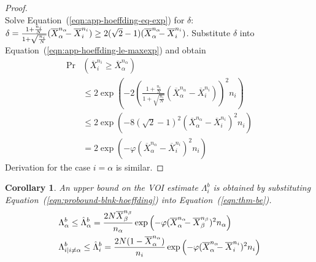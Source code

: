\documentclass[]{article}
\newtheorem{crl}[thm]{Corollary}
\renewcommand{\eqref}[1]{Equation~(\ref{#1})}
\begin{document}
\begin{hiddenproof}
\begin{proof}
\begin{equation}
	\end{equation}
	Solve \eqref{eqn:app-hoeffding-eq-exp} for $\delta$: $\delta=\frac {1+\frac {n_i} N} {1+\sqrt {\frac {n_i} N}} (\overline X_\alpha^{n_\alpha}\hspace{-0.5em}
	- \overline X_i^{n_i}) \ge 2(\sqrt 2 - 1)(\overline X_\alpha^{n_\alpha}\hspace{-0.5em}-\overline X_i^{n_i})$. Substitute $\delta$ into 
	\eqref{eqn:app-hoeffding-le-maxexp} and obtain
	\begin{align}
	\Pr&(\overline X_i^{n_i}\ge \overline X_\alpha^{n_\alpha}) \nonumber\\
	& \le 2\exp\left(-2\left( \frac {1+\frac {n_i} N} {1+\sqrt {\frac {n_i} N}}
	                          (\overline X_\alpha^{n_\alpha} - \overline X_i^{n_i})\right)^2 n_i\right)\nonumber \\
	& \le 2\exp(-8(\sqrt 2 - 1)^2(\overline X_\alpha^{n_\alpha} - \overline X_i^{n_i})^2n_i)\nonumber\\
	& = 2\exp(-\varphi(\overline X_\alpha^{n_\alpha} - \overline X_i^{n_i})^2n_i)
	\end{align}
	Derivation for the case $i=\alpha$ is similar.
	\end{proof}	
\end{hiddenproof}

\begin{crl}
An upper bound on the VOI estimate $\Lambda_i^b$ is obtained
by substituting \eqref{eqn:probound-blnk-hoeffding} into \eqref{eqn:thm-be}.
\begin{align}
  \label{eqn:bound-blnk-hoeffding}
  \Lambda&_\alpha^b \le \hat\Lambda_\alpha^b=\frac {2N\overline X_\beta^{n_\beta}} {n_\alpha}\exp\left(- \varphi(\overline X_\alpha^{n_\alpha}\hspace{-0.5em} - \overline X_\beta^{n_\beta})^2 n_\alpha\right)\nonumber\\
  \Lambda&_{i|i\ne\alpha}^b\le \hat\Lambda_i^b=  \frac {2N(1-\overline  X_\alpha^{n_\alpha})} {n_i}\exp\left(- \varphi(\overline X_\alpha^{n_\alpha}\hspace{-0.5em} - \overline X_i^{n_i})^2 n_i\right)
\end{align}
\label{crl:bound-blnk-hoeffding}
\end{crl}
\vspace{-2em}
\end{document}
